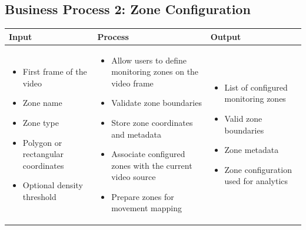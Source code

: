 \documentclass[12pt,a4paper]{report}
\begin{document}
\subsection*{Business Process 2: Zone Configuration}
\begin{longtable}{|p{4.1cm}|p{5.0cm}|p{5.0cm}|}
\hline
\rowcolor{HeaderBlue}
\textbf{Input} & \textbf{Process} & \textbf{Output} \\
\hline

\begin{itemize}[leftmargin=*, nosep]
    \item First frame of the video
    \item Zone name
    \item Zone type
    \item Polygon or rectangular coordinates
    \item Optional density threshold
\end{itemize}
&
\begin{itemize}[leftmargin=*, nosep]
    \item Allow users to define monitoring zones on the video frame
    \item Validate zone boundaries
    \item Store zone coordinates and metadata
    \item Associate configured zones with the current video source
    \item Prepare zones for movement mapping
\end{itemize}
&
\begin{itemize}[leftmargin=*, nosep]
    \item List of configured monitoring zones
    \item Valid zone boundaries
    \item Zone metadata
    \item Zone configuration used for analytics
\end{itemize}
\\
\hline
\end{longtable}
\end{document}
